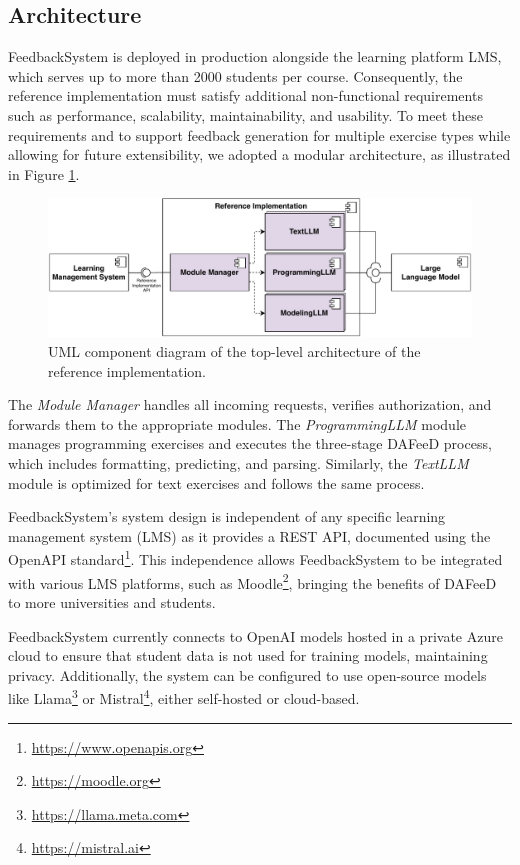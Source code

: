 \documentclass[manuscript,screen,review, anonymous]{acmart}
\begin{document}
\subsection{Architecture}

FeedbackSystem is deployed in production alongside the learning platform LMS, which serves up to more than 2000 students per course.
Consequently, the reference implementation must satisfy additional non-functional requirements such as performance, scalability, maintainability, and usability.
To meet these requirements and to support feedback generation for multiple exercise types while allowing for future extensibility, we adopted a modular architecture, as illustrated in Figure \ref{fig:Athena-architecture}.

\begin{figure}[htbp]
  \centering
  \includegraphics[width=0.8\linewidth]{figures/Athena-Architecture.pdf}
  \caption{UML component diagram of the top-level architecture of the reference implementation.}
  \label{fig:Athena-architecture}
\end{figure}

The \textit{Module Manager} handles all incoming requests, verifies authorization, and forwards them to the appropriate modules.
The \textit{ProgrammingLLM} module manages programming exercises and executes the three-stage DAFeeD process, which includes formatting, predicting, and parsing. 
Similarly, the \textit{TextLLM} module is optimized for text exercises and follows the same process.

FeedbackSystem's system design is independent of any specific learning management system (LMS) as it provides a REST API, documented using the OpenAPI standard\footnote{\url{https://www.openapis.org}}.
This independence allows FeedbackSystem to be integrated with various LMS platforms, such as Moodle\footnote{\url{https://moodle.org}}, bringing the benefits of DAFeeD to more universities and students.

FeedbackSystem currently connects to OpenAI models hosted in a private Azure cloud to ensure that student data is not used for training models, maintaining privacy.
Additionally, the system can be configured to use open-source models like Llama\footnote{\url{https://llama.meta.com}} or Mistral\footnote{\url{https://mistral.ai}}, either self-hosted or cloud-based.
\end{document}
